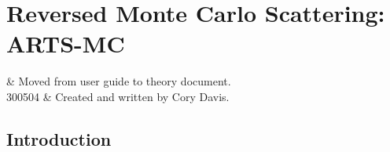 \graphicspath{{Figs/montecarlo/}}

%
%
\chapter{Reversed Monte Carlo Scattering: ARTS-MC}
 \label{sec:montecarlo}


%
%
 & Moved from user guide to theory document.\\
  300504 & Created and written by Cory Davis.\\
\stophistory


%
%
%

%
%




\section{Introduction}
 \label{sec:montecarlo:intro}

